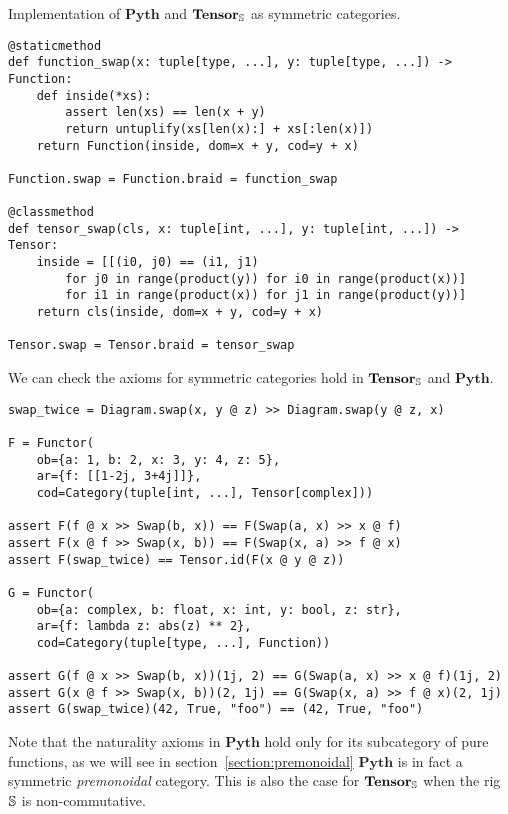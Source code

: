 \begin{python}
{\normalfont Implementation of $\mathbf{Pyth}$ and $\mathbf{Tensor}_\S$ as symmetric categories.}

\begin{verbatim}
@staticmethod
def function_swap(x: tuple[type, ...], y: tuple[type, ...]) -> Function:
    def inside(*xs):
        assert len(xs) == len(x + y)
        return untuplify(xs[len(x):] + xs[:len(x)])
    return Function(inside, dom=x + y, cod=y + x)

Function.swap = Function.braid = function_swap

@classmethod
def tensor_swap(cls, x: tuple[int, ...], y: tuple[int, ...]) -> Tensor:
    inside = [[(i0, j0) == (i1, j1)
        for j0 in range(product(y)) for i0 in range(product(x))]
        for i1 in range(product(x)) for j1 in range(product(y))]
    return cls(inside, dom=x + y, cod=y + x)

Tensor.swap = Tensor.braid = tensor_swap
\end{verbatim}
\end{python}

\begin{example}
We can check the axioms for symmetric categories hold in $\mathbf{Tensor}_\S$ and $\mathbf{Pyth}$.

\begin{verbatim}
swap_twice = Diagram.swap(x, y @ z) >> Diagram.swap(y @ z, x)

F = Functor(
    ob={a: 1, b: 2, x: 3, y: 4, z: 5},
    ar={f: [[1-2j, 3+4j]]},
    cod=Category(tuple[int, ...], Tensor[complex]))

assert F(f @ x >> Swap(b, x)) == F(Swap(a, x) >> x @ f)
assert F(x @ f >> Swap(x, b)) == F(Swap(x, a) >> f @ x)
assert F(swap_twice) == Tensor.id(F(x @ y @ z))

G = Functor(
    ob={a: complex, b: float, x: int, y: bool, z: str},
    ar={f: lambda z: abs(z) ** 2},
    cod=Category(tuple[type, ...], Function))

assert G(f @ x >> Swap(b, x))(1j, 2) == G(Swap(a, x) >> x @ f)(1j, 2)
assert G(x @ f >> Swap(x, b))(2, 1j) == G(Swap(x, a) >> f @ x)(2, 1j)
assert G(swap_twice)(42, True, "foo") == (42, True, "foo")
\end{verbatim}
\end{example}

\begin{remark}
Note that the naturality axioms in $\mathbf{Pyth}$ hold only for its subcategory of pure functions, as we will see in section~\ref{section:premonoidal} $\mathbf{Pyth}$ is in fact a symmetric \emph{premonoidal} category.
This is also the case for $\mathbf{Tensor}_\S$ when the rig $\S$ is non-commutative.
\end{remark}

